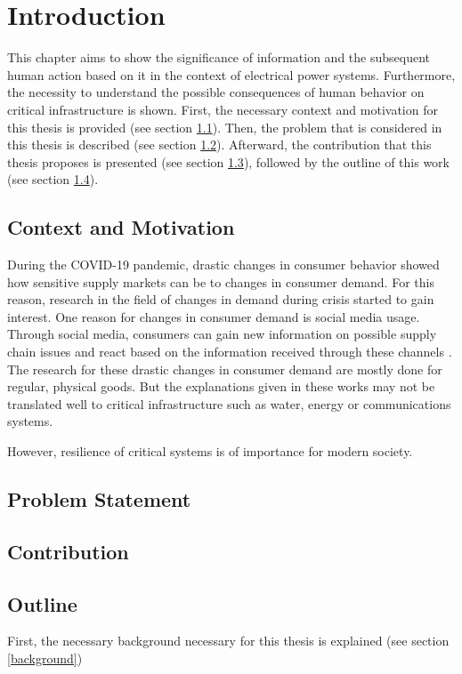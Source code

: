 \chapter{Introduction}

This chapter aims to
show the significance of information and the subsequent human action based on it
in the context of electrical power systems.
Furthermore, the necessity to understand the possible consequences 
of human behavior on critical infrastructure is shown. 
First, the necessary context and motivation for this thesis is provided
(see section \ref{contextmotivation}).
Then, the problem that is considered in this thesis is described 
(see section \ref{problemstatement}). Afterward, the contribution that this
thesis proposes is presented (see section \ref{contribution}), 
followed by the outline of this work (see section \ref{outline}).

\section{Context and Motivation}
\label{contextmotivation}

During the COVID-19 pandemic, drastic changes in consumer behavior
showed how sensitive supply markets can be to changes in consumer demand.
For this reason, research in the field of changes in demand during crisis
started to gain interest. One reason for changes in consumer demand is 
social media usage. Through social media, consumers can gain new information
on possible supply chain issues and react based on the information received 
through these channels \cite{naeem2021social}.
The research for these drastic changes in consumer demand are mostly
done for regular, physical goods. But the explanations given in these 
works may not be translated well to critical infrastructure such as 
water, energy or communications systems.

However, resilience of critical systems is of importance for modern society.



\section{Problem Statement}
\label{problemstatement}
\section{Contribution}
\label{contribution}
\section{Outline}
\label{outline}

First, the necessary background necessary for this thesis is explained
(see section \ref{background})